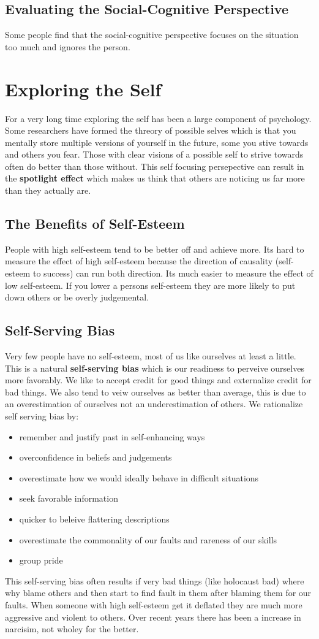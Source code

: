 \documentclass[12pt]{article}
\begin{document}
\subsection*{Evaluating the Social-Cognitive Perspective}
Some people find that the social-cognitive perspective focuses on the situation too much and ignores the person. 
\section*{Exploring the Self}
For a very long time exploring the self has been a large component of psychology. Some researchers have formed the threory of possible selves which is that you mentally store multiple versions of yourself in the future, some you stive towards and others you fear. Those with clear visions of a possible self to strive towards often do better than those without. This self focusing persepective can result in the \textbf{spotlight effect} which makes us think that others are noticing us far more than they actually are.  
\subsection*{The Benefits of Self-Esteem}
People with high self-esteem tend to be better off and achieve more. Its hard to measure the effect of high self-esteem because the direction of causality (self-esteem to success) can run both direction. Its much easier to measure the effect of low self-esteem. If you lower a persons self-esteem they are more likely to put down others or be overly judgemental.
\subsection*{Self-Serving Bias}
Very few people have no self-esteem, most of us like ourselves at least a little. This is a natural \textbf{self-serving bias} which is our readiness to perveive ourselves more favorably. We like to accept credit for good things and externalize credit for bad things.  We also tend to veiw ourselves as better than average, this is due to an overestimation of ourselves not an underestimation of others. We rationalize self serving bias by:
\begin{itemize}
\item remember and justify past in self-enhancing ways
\item overconfidence in beliefs and judgements
\item overestimate how we would ideally behave in difficult situations
\item seek favorable information
\item quicker to beleive flattering descriptions
\item overestimate the commonality of our faults and rareness of our skills
\item group pride
\end{itemize} 
This self-serving bias often results if very bad things (like holocaust bad) where why blame others and then start to find fault in them after blaming them for our faults. When someone with high self-esteem get it deflated they are much more aggressive and violent to others. Over recent years there has been a increase in narcisim, not wholey for the better. 
\end{document}
